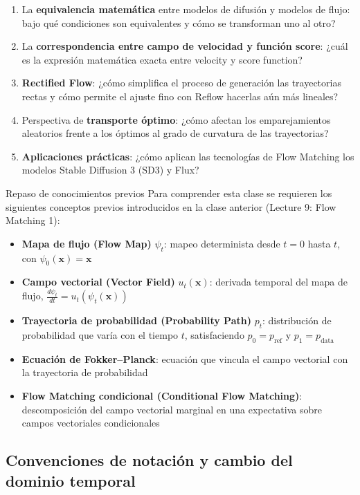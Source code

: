 \documentclass[a4paper]{article}
\begin{document}
\begin{enumerate}
    \item La \textbf{equivalencia matemática} entre modelos de difusión y modelos de flujo: bajo qué condiciones son equivalentes y cómo se transforman uno al otro?
    \item La \textbf{correspondencia entre campo de velocidad y función score}: ¿cuál es la expresión matemática exacta entre velocity y score function?
    \item \textbf{Rectified Flow}: ¿cómo simplifica el proceso de generación las trayectorias rectas y cómo permite el ajuste fino con Reflow hacerlas aún más lineales?
    \item Perspectiva de \textbf{transporte óptimo}: ¿cómo afectan los emparejamientos aleatorios frente a los óptimos al grado de curvatura de las trayectorias?
    \item \textbf{Aplicaciones prácticas}: ¿cómo aplican las tecnologías de Flow Matching los modelos Stable Diffusion 3 (SD3) y Flux?
\end{enumerate}

\begin{knowledgebox}{Repaso de conocimientos previos}
Para comprender esta clase se requieren los siguientes conceptos previos introducidos en la clase anterior (Lecture 9: Flow Matching 1):
\begin{itemize}
    \item \textbf{Mapa de flujo (Flow Map)} $\psi_t$: mapeo determinista desde $t=0$ hasta $t$, con $\psi_0(\mathbf{x}) = \mathbf{x}$
    \item \textbf{Campo vectorial (Vector Field)} $u_t(\mathbf{x})$: derivada temporal del mapa de flujo, $\frac{d\psi_t}{dt} = u_t(\psi_t(\mathbf{x}))$
    \item \textbf{Trayectoria de probabilidad (Probability Path)} $p_t$: distribución de probabilidad que varía con el tiempo $t$, satisfaciendo $p_0 = p_{\text{ref}}$ y $p_1 = p_{\text{data}}$
    \item \textbf{Ecuación de Fokker--Planck}: ecuación que vincula el campo vectorial con la trayectoria de probabilidad
    \item \textbf{Flow Matching condicional (Conditional Flow Matching)}: descomposición del campo vectorial marginal en una expectativa sobre campos vectoriales condicionales
\end{itemize}
\end{knowledgebox}

\subsection{Convenciones de notación y cambio del dominio temporal}
\end{document}
